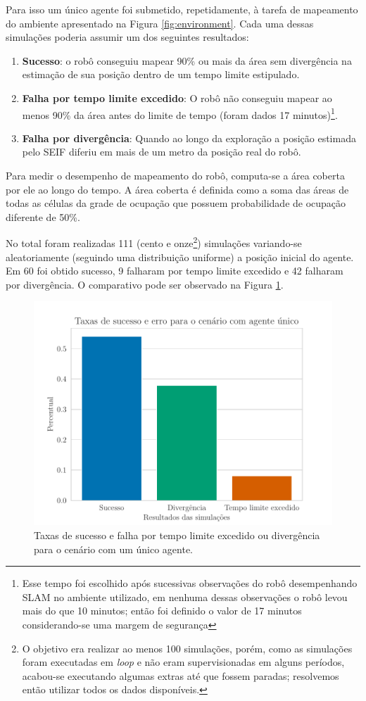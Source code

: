 Para isso um único agente foi submetido, repetidamente, à tarefa de mapeamento do ambiente apresentado na Figura \ref{fig:environment}. 
Cada uma dessas simulações poderia assumir um dos seguintes resultados:
\begin{enumerate}
  \item \textbf{Sucesso}: o robô conseguiu mapear 90\% ou mais da área sem 
  divergência na estimação de sua posição dentro de um tempo limite estipulado.
  \item \textbf{Falha por tempo limite excedido}: O robô não conseguiu mapear ao 
  menos 90\% da área antes do limite de tempo (foram dados 17 
  minutos)\footnote{Esse tempo foi escolhido após sucessivas observações do robô desempenhando SLAM no ambiente utilizado, em nenhuma dessas observações o robô levou mais do que 10 minutos; então foi definido o valor de 17 minutos considerando-se uma margem de segurança}.
  \item \textbf{Falha por divergência}: Quando ao longo da exploração a posição estimada pelo SEIF diferiu em mais de um metro da posição real do robô.
\end{enumerate}

Para medir o desempenho de mapeamento do robô, 
computa-se a área coberta 
por ele ao longo do tempo. A área coberta é definida como a soma das 
áreas de todas as células da grade de ocupação que possuem probabilidade 
de ocupação diferente de 50\%.

No total foram realizadas 111 (cento e onze\footnote{O objetivo era realizar ao menos 100 simulações, porém, como as simulações foram executadas em \textit{loop} e não eram supervisionadas em alguns períodos, acabou-se executando algumas extras até que fossem paradas; resolvemos então utilizar todos os dados disponíveis.}) simulações variando-se aleatoriamente (seguindo uma distribuição uniforme) a posição inicial do agente. Em 60 foi obtido 
sucesso, 9 falharam por tempo limite excedido e 42 falharam por 
divergência. O comparativo pode ser observado na Figura \ref{fig:exp-single-robot-sucess-rate}.
\begin{figure}
  \centering
  \includegraphics[width=.7\textwidth]{figs/success_rate_bar_single_robot.pdf}
  \caption[Taxas de sucesso e falha para simulações com um único agente]{Taxas de sucesso e falha por tempo limite excedido ou divergência para o cenário com um único agente.}
  \label{fig:exp-single-robot-sucess-rate}
\end{figure}

